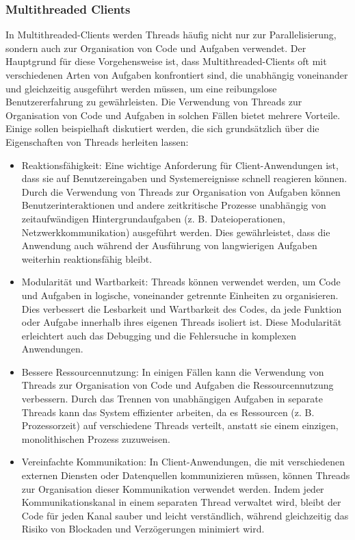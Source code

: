 \documentclass[../vs-script-first-v01.tex]{subfiles}
\begin{document}
\subsubsection{Multithreaded Clients}
In Multithreaded-Clients werden Threads häufig nicht nur zur Parallelisierung, sondern auch zur Organisation von Code und Aufgaben verwendet. Der Hauptgrund für diese Vorgehensweise ist, dass Multithreaded-Clients oft mit verschiedenen Arten von Aufgaben konfrontiert sind, die unabhängig voneinander und gleichzeitig ausgeführt werden müssen, um eine reibungslose Benutzererfahrung zu gewährleisten.
Die Verwendung von Threads zur Organisation von Code und Aufgaben in solchen Fällen bietet mehrere Vorteile. Einige sollen beispielhaft diskutiert werden, die sich grundsätzlich über die Eigenschaften von Threads herleiten lassen:
\begin{itemize}
\item Reaktionsfähigkeit: Eine wichtige Anforderung für Client-Anwendungen ist, dass sie auf Benutzereingaben und Systemereignisse schnell reagieren können. Durch die Verwendung von Threads zur Organisation von Aufgaben können Benutzerinteraktionen und andere zeitkritische Prozesse unabhängig von zeitaufwändigen Hintergrundaufgaben (z. B. Dateioperationen, Netzwerkkommunikation) ausgeführt werden. Dies gewährleistet, dass die Anwendung auch während der Ausführung von langwierigen Aufgaben weiterhin reaktionsfähig bleibt.
\item Modularität und Wartbarkeit: Threads können verwendet werden, um Code und Aufgaben in logische, voneinander getrennte Einheiten zu organisieren. Dies verbessert die Lesbarkeit und Wartbarkeit des Codes, da jede Funktion oder Aufgabe innerhalb ihres eigenen Threads isoliert ist. Diese Modularität erleichtert auch das Debugging und die Fehlersuche in komplexen Anwendungen.
\item Bessere Ressourcennutzung: In einigen Fällen kann die Verwendung von Threads zur Organisation von Code und Aufgaben die Ressourcennutzung verbessern. Durch das Trennen von unabhängigen Aufgaben in separate Threads kann das System effizienter arbeiten, da es Ressourcen (z. B. Prozessorzeit) auf verschiedene Threads verteilt, anstatt sie einem einzigen, monolithischen Prozess zuzuweisen.
\item Vereinfachte Kommunikation: In Client-Anwendungen, die mit verschiedenen externen Diensten oder Datenquellen kommunizieren müssen, können Threads zur Organisation dieser Kommunikation verwendet werden. Indem jeder Kommunikationskanal in einem separaten Thread verwaltet wird, bleibt der Code für jeden Kanal sauber und leicht verständlich, während gleichzeitig das Risiko von Blockaden und Verzögerungen minimiert wird.
\end{itemize}
\end{document}
